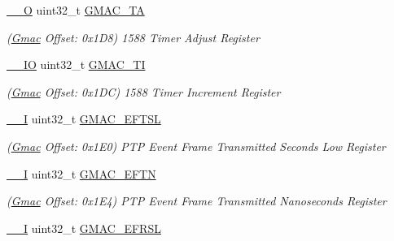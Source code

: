 \begin{DoxyCompactItemize}
\mbox{\hyperlink{core__cm7_8h_a7e25d9380f9ef903923964322e71f2f6}{\+\_\+\+\_\+O}} uint32\+\_\+t \mbox{\hyperlink{structGmac_aee9dbb0e1023ba970c8300bef7221950}{G\+M\+A\+C\+\_\+\+TA}}
\begin{DoxyCompactList}\small\item\em (\mbox{\hyperlink{structGmac}{Gmac}} Offset\+: 0x1\+D8) 1588 Timer Adjust Register \end{DoxyCompactList}\item 
\mbox{\label{structGmac_a5db14412bfa322e1ad1be4bb73104a73}} 
\mbox{\hyperlink{core__cm7_8h_aec43007d9998a0a0e01faede4133d6be}{\+\_\+\+\_\+\+IO}} uint32\+\_\+t \mbox{\hyperlink{structGmac_a5db14412bfa322e1ad1be4bb73104a73}{G\+M\+A\+C\+\_\+\+TI}}
\begin{DoxyCompactList}\small\item\em (\mbox{\hyperlink{structGmac}{Gmac}} Offset\+: 0x1\+DC) 1588 Timer Increment Register \end{DoxyCompactList}\item 
\mbox{\label{structGmac_ac490b233bf3eec3ebee44a98554c3439}} 
\mbox{\hyperlink{core__cm7_8h_af63697ed9952cc71e1225efe205f6cd3}{\+\_\+\+\_\+I}} uint32\+\_\+t \mbox{\hyperlink{structGmac_ac490b233bf3eec3ebee44a98554c3439}{G\+M\+A\+C\+\_\+\+E\+F\+T\+SL}}
\begin{DoxyCompactList}\small\item\em (\mbox{\hyperlink{structGmac}{Gmac}} Offset\+: 0x1\+E0) P\+TP Event Frame Transmitted Seconds Low Register \end{DoxyCompactList}\item 
\mbox{\label{structGmac_a9af5bbcb02fb62aecc3698bd046bb5fb}} 
\mbox{\hyperlink{core__cm7_8h_af63697ed9952cc71e1225efe205f6cd3}{\+\_\+\+\_\+I}} uint32\+\_\+t \mbox{\hyperlink{structGmac_a9af5bbcb02fb62aecc3698bd046bb5fb}{G\+M\+A\+C\+\_\+\+E\+F\+TN}}
\begin{DoxyCompactList}\small\item\em (\mbox{\hyperlink{structGmac}{Gmac}} Offset\+: 0x1\+E4) P\+TP Event Frame Transmitted Nanoseconds Register \end{DoxyCompactList}\item 
\mbox{\label{structGmac_a34141f1743f1320241b57255f13bc4aa}} 
\mbox{\hyperlink{core__cm7_8h_af63697ed9952cc71e1225efe205f6cd3}{\+\_\+\+\_\+I}} uint32\+\_\+t \mbox{\hyperlink{structGmac_a34141f1743f1320241b57255f13bc4aa}{G\+M\+A\+C\+\_\+\+E\+F\+R\+SL}}

\end{DoxyCompactItemize}
